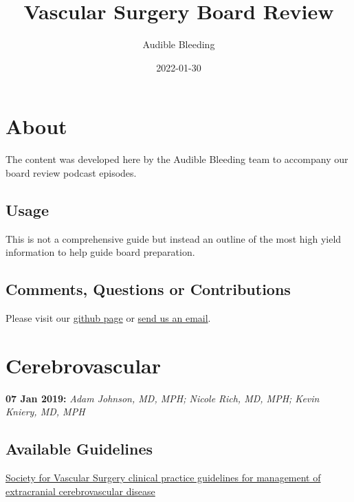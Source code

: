 \documentclass[
]{book}
\title{Vascular Surgery Board Review}
\author{Audible Bleeding}
\date{2022-01-30}
\begin{document}
\maketitle

{
\setcounter{tocdepth}{1}
\tableofcontents
}
\hypertarget{about}{%
\chapter{About}\label{about}}

The content was developed here by the Audible Bleeding team to accompany our board review podcast episodes.

\hypertarget{usage}{%
\section{Usage}\label{usage}}

This is not a comprehensive guide but instead an outline of the most high yield information to help guide board preparation.

\hypertarget{comments-questions-or-contributions}{%
\section{Comments, Questions or Contributions}\label{comments-questions-or-contributions}}

Please visit our \href{https://github.com/adam-mdmph/VS-Board-Review}{github page} or \href{mailto:audiblebleeding@vascularsociety.org}{send us an email}.

\hypertarget{cerebrovascular}{%
\chapter{Cerebrovascular}\label{cerebrovascular}}

\textbf{07 Jan 2019:} \emph{Adam Johnson, MD, MPH; Nicole Rich, MD, MPH; Kevin
Kniery, MD, MPH}

\hypertarget{available-guidelines}{%
\section{Available Guidelines}\label{available-guidelines}}

\href{https://www.jvascsurg.org/article/S0741-5214(21)00893-4/fulltext}{Society for Vascular Surgery clinical practice guidelines for
management of extracranial cerebrovascular
disease}
\citet{aburahmaSocietyVascularSurgery2022}
\end{document}
